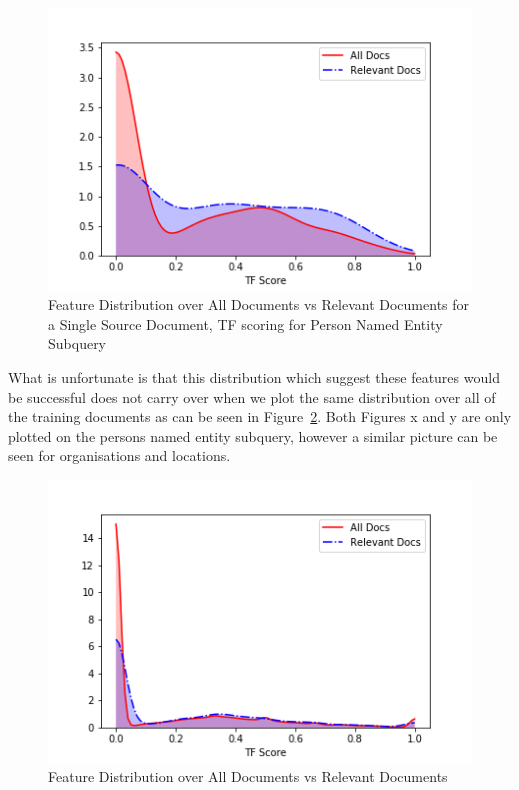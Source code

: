 \documentclass{mpaper}
\begin{document}
\begin{figure}[H]
\begin{center}
\includegraphics[scale=0.5]{single.png}
\end{center}
\caption{\label{fig:gooddist} Feature Distribution over All Documents vs Relevant Documents for a Single Source Document, TF scoring for Person Named Entity Subquery}
\end{figure}

What is unfortunate is that this distribution which suggest these features would be successful does not carry over when we plot the same distribution over all of the training documents as can be seen in Figure~\ref{fig:distribution}. Both Figures x and y are only plotted on the persons named entity subquery, however a similar picture can be seen for organisations and locations.

\begin{figure}[H]
\begin{center}
\includegraphics[scale=0.5]{persons.png}
\end{center}
\caption{\label{fig:distribution} Feature Distribution over All Documents vs Relevant Documents}
\end{figure}
\end{document}
